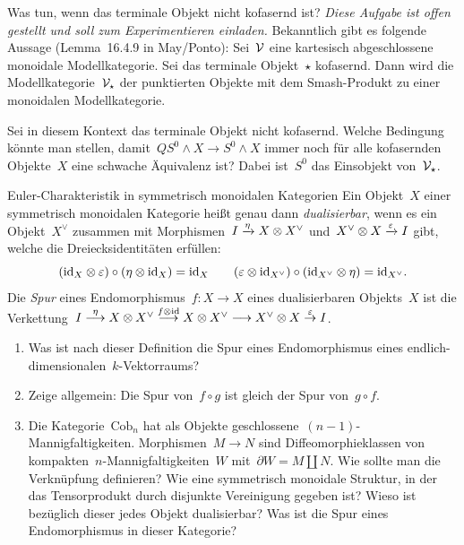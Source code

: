 \documentclass{uebblatt}
\begin{document}
\enlargethispage{1em}

\begin{aufgabe}{Was tun, wenn das terminale Objekt nicht kofasernd ist?}
\emph{Diese Aufgabe ist offen gestellt und soll zum Experimentieren einladen.}
Bekanntlich gibt es folgende Aussage (Lemma~16.4.9 in May/Ponto): Sei~$\mathcal{V}$ eine
kartesisch abgeschlossene monoidale Modellkategorie. Sei das terminale
Objekt~$\star$ kofasernd. Dann wird die Modellkategorie~$\mathcal{V}_\star$ der punktierten
Objekte mit dem Smash-Produkt zu einer monoidalen Modellkategorie.

Sei in diesem Kontext das terminale Objekt nicht kofasernd. Welche Bedingung könnte man
stellen, damit~$QS^0 \wedge X \to S^0 \wedge X$ immer noch für alle kofasernden
Objekte~$X$ eine schwache Äquivalenz ist? Dabei ist~$S^0$ das Einsobjekt
von~$\mathcal{V}_\star$.
\end{aufgabe}

\begin{aufgabe}{Euler-Charakteristik in symmetrisch monoidalen Kategorien}
Ein Objekt~$X$ einer symmetrisch monoidalen Kategorie heißt genau dann
\emph{dualisierbar}, wenn es ein Objekt~$X^\vee$ zusammen mit Morphismen~$I
\xrightarrow{\eta} X \otimes X^\vee$ und~$X^\vee \otimes X \xrightarrow{\varepsilon} I$ gibt,
welche die Dreiecksidentitäten erfüllen:
\[ (\mathrm{id}_X \otimes \varepsilon) \circ (\eta \otimes \mathrm{id}_X) = \mathrm{id}_X \qquad
  (\varepsilon \otimes \mathrm{id}_{X^\vee}) \circ (\mathrm{id}_{X^\vee} \otimes \eta) = \mathrm{id}_{X^\vee}. \]
Die \emph{Spur} eines Endomorphismus~$f : X \to X$ eines dualisierbaren
Objekts~$X$ ist die Verkettung~$I \stackrel{\eta}{\longrightarrow} X \otimes X^\vee
\stackrel{f \otimes \mathrm{id}}{\longrightarrow} X \otimes X^\vee \longrightarrow X^\vee \otimes X
\stackrel{\varepsilon}{\to} I$.
\begin{enumerate}
\item Was ist nach dieser Definition die Spur eines Endomorphismus eines
endlich-dimensionalen~$k$-Vektorraums?
\item Zeige allgemein: Die Spur von~$f \circ g$ ist gleich der Spur von~$g
\circ f$.
\item Die Kategorie~$\mathrm{Cob}_n$ hat als Objekte
geschlossene~$(n-1)$-Mannigfaltigkeiten. Morphismen~$M \to N$
sind Diffeomorphieklassen von kompakten~$n$-Mannigfaltigkeiten~$W$ mit~$\partial W = M
\amalg N$. Wie sollte man die Verknüpfung definieren? Wie eine symmetrisch
monoidale Struktur, in der das Tensorprodukt durch disjunkte Vereinigung
gegeben ist? Wieso ist bezüglich dieser jedes Objekt dualisierbar? Was
ist die Spur eines Endomorphismus in dieser Kategorie?
\end{enumerate}
\end{aufgabe}
\end{document}
